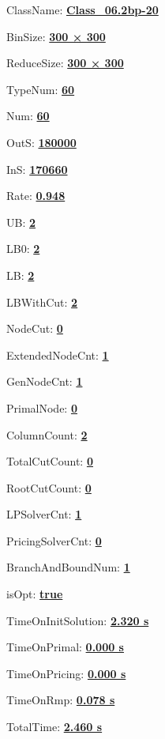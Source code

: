 \documentclass[11pt]{article}
\begin{document}
\pagestyle{empty}


ClassName: \underline{\textbf{Class_06.2bp-20}}
\par
BinSize: \underline{\textbf{300 × 300}}
\par
ReduceSize: \underline{\textbf{300 × 300}}
\par
TypeNum: \underline{\textbf{60}}
\par
Num: \underline{\textbf{60}}
\par
OutS: \underline{\textbf{180000}}
\par
InS: \underline{\textbf{170660}}
\par
Rate: \underline{\textbf{0.948}}
\par
UB: \underline{\textbf{2}}
\par
LB0: \underline{\textbf{2}}
\par
LB: \underline{\textbf{2}}
\par
LBWithCut: \underline{\textbf{2}}
\par
NodeCut: \underline{\textbf{0}}
\par
ExtendedNodeCnt: \underline{\textbf{1}}
\par
GenNodeCnt: \underline{\textbf{1}}
\par
PrimalNode: \underline{\textbf{0}}
\par
ColumnCount: \underline{\textbf{2}}
\par
TotalCutCount: \underline{\textbf{0}}
\par
RootCutCount: \underline{\textbf{0}}
\par
LPSolverCnt: \underline{\textbf{1}}
\par
PricingSolverCnt: \underline{\textbf{0}}
\par
BranchAndBoundNum: \underline{\textbf{1}}
\par
isOpt: \underline{\textbf{true}}
\par
TimeOnInitSolution: \underline{\textbf{2.320 s}}
\par
TimeOnPrimal: \underline{\textbf{0.000 s}}
\par
TimeOnPricing: \underline{\textbf{0.000 s}}
\par
TimeOnRmp: \underline{\textbf{0.078 s}}
\par
TotalTime: \underline{\textbf{2.460 s}}
\par
\newpage
\end{document}
